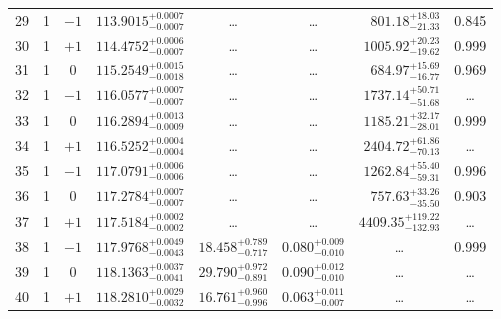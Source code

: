 \begin{table*}[!]
\begin{tabular}{llcrrlrc}
29 & 1 & $-1$ & $    113.9015_{-      0.0007}^{+      0.0007}$ & \multicolumn{1}{c}{\dots} & \multicolumn{1}{c}{\dots} & $      801.18_{-       21.33}^{+       18.03}$ & 0.845\\[1pt]
30 & 1 & $+1$ & $    114.4752_{-      0.0007}^{+      0.0006}$ & \multicolumn{1}{c}{\dots} & \multicolumn{1}{c}{\dots} & $     1005.92_{-       19.62}^{+       20.23}$ & 0.999\\[1pt]
31 & 1 & 0 & $    115.2549_{-      0.0018}^{+      0.0015}$ & \multicolumn{1}{c}{\dots} & \multicolumn{1}{c}{\dots} & $      684.97_{-       16.77}^{+       15.69}$ & 0.969\\[1pt]
32 & 1 & $-1$ & $    116.0577_{-      0.0007}^{+      0.0007}$ & \multicolumn{1}{c}{\dots} & \multicolumn{1}{c}{\dots} & $     1737.14_{-       51.68}^{+       50.71}$ & \dots \\[1pt]
33 & 1 & 0 & $    116.2894_{-      0.0009}^{+      0.0013}$ & \multicolumn{1}{c}{\dots} & \multicolumn{1}{c}{\dots} & $     1185.21_{-       28.01}^{+       32.17}$ & 0.999\\[1pt]
34 & 1 & $+1$ & $    116.5252_{-      0.0004}^{+      0.0004}$ & \multicolumn{1}{c}{\dots} & \multicolumn{1}{c}{\dots} & $     2404.72_{-       70.13}^{+       61.86}$ & \dots\\[1pt]
35 & 1 & $-1$ & $    117.0791_{-      0.0006}^{+      0.0006}$ & \multicolumn{1}{c}{\dots} & \multicolumn{1}{c}{\dots} & $     1262.84_{-       59.31}^{+       55.40}$ & 0.996\\[1pt]
36 & 1 & 0 & $    117.2784_{-      0.0007}^{+      0.0007}$ & \multicolumn{1}{c}{\dots} & \multicolumn{1}{c}{\dots} & $      757.63_{-       35.50}^{+       33.26}$ & 0.903\\[1pt]
37 & 1 & $+1$ & $    117.5184_{-      0.0002}^{+      0.0002}$ & \multicolumn{1}{c}{\dots} & \multicolumn{1}{c}{\dots} & $     4409.35_{-      132.93}^{+      119.22}$ & \dots \\[1pt]
38 & 1 & $-1$ & $    117.9768_{-      0.0043}^{+      0.0049}$ & $      18.458_{-       0.717}^{+       0.789}$ & $       0.080_{-       0.010}^{+       0.009}$ & \multicolumn{1}{c}{\dots} & 0.999\\[1pt]
39 & 1 & 0 & $    118.1363_{-      0.0041}^{+      0.0037}$ & $      29.790_{-       0.891}^{+       0.972}$ & $       0.090_{-       0.010}^{+       0.012}$ & \multicolumn{1}{c}{\dots} & \dots \\[1pt]
40 & 1 & $+1$ & $    118.2810_{-      0.0032}^{+      0.0029}$ & $      16.761_{-       0.996}^{+       0.960}$ & $       0.063_{-       0.007}^{+       0.011}$ & \multicolumn{1}{c}{\dots} & \dots \\[1pt]

\end{tabular}
\end{table*}
